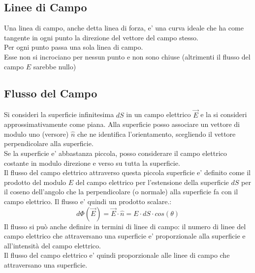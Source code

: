 \documentclass[a4paper, 10pt]{article}
\begin{document}
	    	\subsection{Linee di Campo}
	    		Una linea di campo, anche detta linea di forza, e' una curva ideale che ha come tangente in ogni punto la
	    		direzione del vettore del campo stesso. \\Per ogni punto passa una sola linea di campo. \\
	    		Esse non si incrociano per nessun punto e non sono chiuse (altrimenti il flusso del campo $E$ sarebbe nullo)
		\subsection{Flusso del Campo}
			Si consideri la superficie infinitesima $dS$ in un campo elettrico $\overrightarrow{E}$ e la si consideri
			approssimativamente come piana. Alla superficie posso associare un vettore di modulo uno (versore) 
			$\widehat{n}$ che ne identifica l'orientamento, scegliendo il vettore perpendicolare alla superficie. \\
			Se la superficie e' abbastanza piccola, posso considerare il campo elettrico costante in modulo direzione e 
			verso su tutta la superficie. \\
			Il flusso del campo elettrico attraverso questa piccola superficie e' definito come il prodotto del modulo $E$ del 
			campo elettrico per l'estensione della superficie $dS$ per il coseno dell'angolo che la perpendicolare (o normale)
			alla superficie fa con il campo elettrico. Il flusso e' quindi un prodotto scalare.:
			\[ d \Phi (\overrightarrow{E}) = \overrightarrow{E} \cdot \widehat{n} = E \cdot dS \cdot cos(\theta)\]
			Il flusso si può anche definire in termini di linee di campo: il numero di linee del campo elettrico che attraversano
			una superficie e' proporzionale alla superficie e all'intensità del campo elettrico. \\ 
			Il flusso del campo elettrico e' quindi proporzionale alle linee di campo che attraversano una superficie.
\end{document}
